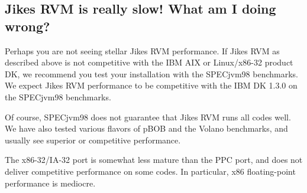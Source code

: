 \subsection{Jikes RVM is really slow! What am I doing wrong?}

Perhaps you are not seeing stellar Jikes\TMweb{} RVM performance.
If Jikes RVM as described above is not competitive with the IBM
AIX\TMweb{} or Linux\Rweb/x86-32 product DK, we recommend you test
your installation with the SPECjvm\TMweb{}98 benchmarks.  We expect Jikes RVM
performance to be competitive with the IBM\Rweb{} DK 1.3.0 on the SPECjvm98
benchmarks.

Of course, SPECjvm98 does not guarantee that Jikes RVM runs all codes
well.  We have also tested various flavors of pBOB and the Volano
benchmarks, and usually see superior or competitive performance.

The x86-32\-/\-IA-32 port is somewhat less mature than the PPC port, and does not
deliver competitive performance on some codes.  In particular, x86
floating-point performance is mediocre.

